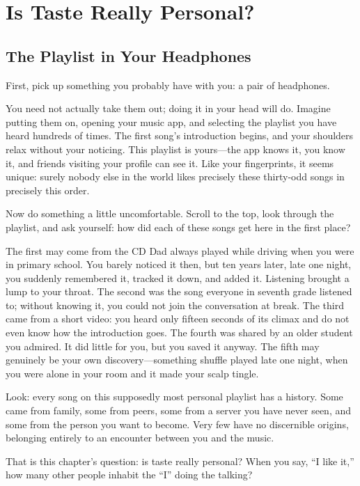 \chapter{Is Taste Really Personal?}
\section{The Playlist in Your Headphones}
First, pick up something you probably have with you: a pair of headphones.

You need not actually take them out; doing it in your head will do. Imagine putting them on, opening your music app, and selecting the playlist you have heard hundreds of times. The first song's introduction begins, and your shoulders relax without your noticing. This playlist is yours---the app knows it, you know it, and friends visiting your profile can see it. Like your fingerprints, it seems unique: surely nobody else in the world likes precisely these thirty-odd songs in precisely this order.

Now do something a little uncomfortable. Scroll to the top, look through the playlist, and ask yourself: how did each of these songs get here in the first place?

The first may come from the CD Dad always played while driving when you were in primary school. You barely noticed it then, but ten years later, late one night, you suddenly remembered it, tracked it down, and added it. Listening brought a lump to your throat. The second was the song everyone in seventh grade listened to; without knowing it, you could not join the conversation at break. The third came from a short video: you heard only fifteen seconds of its climax and do not even know how the introduction goes. The fourth was shared by an older student you admired. It did little for you, but you saved it anyway. The fifth may genuinely be your own discovery---something shuffle played late one night, when you were alone in your room and it made your scalp tingle.

Look: every song on this supposedly most personal playlist has a history. Some came from family, some from peers, some from a server you have never seen, and some from the person you want to become. Very few have no discernible origins, belonging entirely to an encounter between you and the music.

That is this chapter's question: is taste really personal? When you say, ``I like it,'' how many other people inhabit the ``I'' doing the talking?

